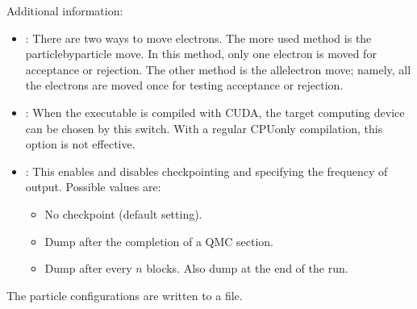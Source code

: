 \documentclass[letterpaper,10pt,english]{sphinxmanual}
\begin{document}
Additional information:
\begin{itemize}
\item {} 
: There are two ways to move electrons. The more used method
is the particle\sphinxhyphen{}by\sphinxhyphen{}particle move. In this method, only one electron
is moved for acceptance or rejection. The other method is the
all\sphinxhyphen{}electron move; namely, all the electrons are moved once for
testing acceptance or rejection.

\item {} 
: When the executable is compiled with CUDA, the target
computing device can be chosen by this switch. With a regular
CPU\sphinxhyphen{}only compilation, this option is not effective.

\item {} 
: This enables and disables checkpointing and
specifying the frequency of output. Possible values are:
\begin{itemize}
\item {} 
\sphinxstylestrong{{[}\sphinxhyphen{}1{]}} No checkpoint (default setting).

\item {} 
\sphinxstylestrong{{[}0{]}} Dump after the completion of a QMC section.

\item {} 
\sphinxstylestrong{{[}n{]}} Dump after every \(n\) blocks.  Also dump at the end of the run.

\end{itemize}

\end{itemize}

The particle configurations are written to a  file.
\def\sphinxLiteralBlockLabel{\label{\detokenize{methods:listing-42}}}
\begin{sphinxVerbatim}[commandchars=\\\{\}]
    
              
                 
                   
\end{sphinxVerbatim}
\end{document}
